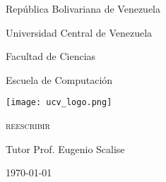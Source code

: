\begin{titlepage}
	\centering
	{\large República Bolivariana de Venezuela \par}
	{\large Universidad Central de Venezuela\par}
	{\large Facultad de Ciencias\par}
	{\large Escuela de Computación\par}\vspace{2cm}

	\texttt{[image: ucv\_logo.png]}\par\vspace{1cm}
	{\scshape\Large\textbf{\@title} reescribir\par}
	\vfill

	{\large Tutor Prof. Eugenio Scalise \par}
	{\large \@author \par}
	{\large \mydate\today \par}
\end{titlepage}